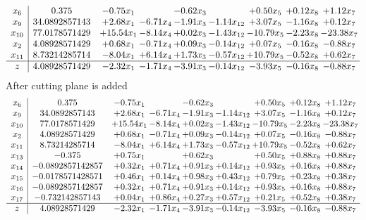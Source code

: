 \documentclass[8pt]{article}
\begin{document}
\[\begin{array}{c| c c@{\hskip 2pt} c@{\hskip 2pt} c@{\hskip 2pt} c@{\hskip 2pt} c@{\hskip 2pt} c@{\hskip 2pt} c@{\hskip 2pt} }
 x_{6}   &  0.375 & -0.75 x_{1} &   & -0.62 x_{3} &   & +  0.50 x_{5} & +  0.12 x_{8} & +  1.12 x_{7}\\
 x_{9}   &  34.0892857143 & +  2.68 x_{1} & -6.71 x_{4} & -1.91 x_{3} & -1.14 x_{12} & +  3.07 x_{5} & -1.16 x_{8} & +  0.12 x_{7}\\
 x_{10}   &  77.0178571429 & + 15.54 x_{1} & -8.14 x_{4} & +  0.02 x_{3} & -1.43 x_{12} & -10.79 x_{5} & -2.23 x_{8} & -23.38 x_{7}\\
 x_{2}   &  4.08928571429 & +  0.68 x_{1} & -0.71 x_{4} & +  0.09 x_{3} & -0.14 x_{12} & +  0.07 x_{5} & -0.16 x_{8} & -0.88 x_{7}\\
 x_{11}   &  8.73214285714 & -8.04 x_{1} & +  6.14 x_{4} & +  1.73 x_{3} & -0.57 x_{12} & + 10.79 x_{5} & -0.52 x_{8} & +  0.62 x_{7}\\
\hline
z    &  4.08928571429 & -2.32 x_{1} & -1.71 x_{4} & -3.91 x_{3} & -0.14 x_{12} & -3.93 x_{5} & -0.16 x_{8} & -0.88 x_{7}\\
\end{array}\]
 After cutting plane is added 
\[\begin{array}{c| c c@{\hskip 2pt} c@{\hskip 2pt} c@{\hskip 2pt} c@{\hskip 2pt} c@{\hskip 2pt} c@{\hskip 2pt} c@{\hskip 2pt} }
 x_{6}   &  0.375 & -0.75 x_{1} &   & -0.62 x_{3} &   & +  0.50 x_{5} & +  0.12 x_{8} & +  1.12 x_{7}\\
 x_{9}   &  34.0892857143 & +  2.68 x_{1} & -6.71 x_{4} & -1.91 x_{3} & -1.14 x_{12} & +  3.07 x_{5} & -1.16 x_{8} & +  0.12 x_{7}\\
 x_{10}   &  77.0178571429 & + 15.54 x_{1} & -8.14 x_{4} & +  0.02 x_{3} & -1.43 x_{12} & -10.79 x_{5} & -2.23 x_{8} & -23.38 x_{7}\\
 x_{2}   &  4.08928571429 & +  0.68 x_{1} & -0.71 x_{4} & +  0.09 x_{3} & -0.14 x_{12} & +  0.07 x_{5} & -0.16 x_{8} & -0.88 x_{7}\\
 x_{11}   &  8.73214285714 & -8.04 x_{1} & +  6.14 x_{4} & +  1.73 x_{3} & -0.57 x_{12} & + 10.79 x_{5} & -0.52 x_{8} & +  0.62 x_{7}\\
 x_{13}   &  -0.375 & +  0.75 x_{1} &   & +  0.62 x_{3} &   & +  0.50 x_{5} & +  0.88 x_{8} & +  0.88 x_{7}\\
 x_{14}   &  -0.0892857142857 & +  0.32 x_{1} & +  0.71 x_{4} & +  0.91 x_{3} & +  0.14 x_{12} & +  0.93 x_{5} & +  0.16 x_{8} & +  0.88 x_{7}\\
 x_{15}   &  -0.0178571428571 & +  0.46 x_{1} & +  0.14 x_{4} & +  0.98 x_{3} & +  0.43 x_{12} & +  0.79 x_{5} & +  0.23 x_{8} & +  0.38 x_{7}\\
 x_{16}   &  -0.0892857142857 & +  0.32 x_{1} & +  0.71 x_{4} & +  0.91 x_{3} & +  0.14 x_{12} & +  0.93 x_{5} & +  0.16 x_{8} & +  0.88 x_{7}\\
 x_{17}   &  -0.732142857143 & +  0.04 x_{1} & +  0.86 x_{4} & +  0.27 x_{3} & +  0.57 x_{12} & +  0.21 x_{5} & +  0.52 x_{8} & +  0.38 x_{7}\\
\hline
z    &  4.08928571429 & -2.32 x_{1} & -1.71 x_{4} & -3.91 x_{3} & -0.14 x_{12} & -3.93 x_{5} & -0.16 x_{8} & -0.88 x_{7}\\
\end{array}\]
\end{document}
